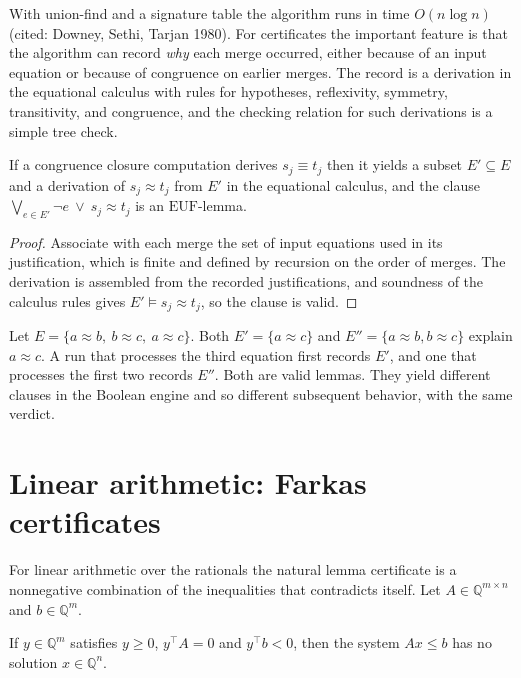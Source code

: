 With union-find and a signature table the algorithm runs in time $O(n\log n)$ (cited: Downey, Sethi, Tarjan 1980). For certificates the important feature is that the algorithm can record \emph{why} each merge occurred, either because of an input equation or because of congruence on earlier merges. The record is a derivation in the equational calculus with rules for hypotheses, reflexivity, symmetry, transitivity, and congruence, and the checking relation for such derivations is a simple tree check.

\begin{proposition}
\label{prop:cc-explain}
If a congruence closure computation derives $s_j\equiv t_j$ then it yields a subset $E'\subseteq E$ and a derivation of $s_j\approx t_j$ from $E'$ in the equational calculus, and the clause $\bigvee_{e\in E'}\neg e\ \vee\ s_j\approx t_j$ is an $\mathrm{EUF}$-lemma.
\end{proposition}

\begin{proof}
Associate with each merge the set of input equations used in its justification, which is finite and defined by recursion on the order of merges. The derivation is assembled from the recorded justifications, and soundness of the calculus rules gives $E'\models s_j\approx t_j$, so the clause is valid.
\end{proof}

\begin{example}
\label{ex:explanations}
Let $E=\{a\approx b,\ b\approx c,\ a\approx c\}$. Both $E'=\{a\approx c\}$ and $E''=\{a\approx b,b\approx c\}$ explain $a\approx c$. A run that processes the third equation first records $E'$, and one that processes the first two records $E''$. Both are valid lemmas. They yield different clauses in the Boolean engine and so different subsequent behavior, with the same verdict.
\end{example}

\section{Linear arithmetic: Farkas certificates}
\label{sec:farkas}

For linear arithmetic over the rationals the natural lemma certificate is a nonnegative combination of the inequalities that contradicts itself. Let $A\in\mathbb{Q}^{m\times n}$ and $b\in\mathbb{Q}^m$.

\begin{proposition}
\label{prop:farkas-sound}
If $y\in\mathbb{Q}^m$ satisfies $y\ge0$, $y^{\top}A=0$ and $y^{\top}b<0$, then the system $Ax\le b$ has no solution $x\in\mathbb{Q}^n$.
\end{proposition}

